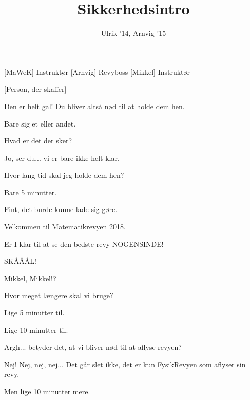 \documentclass[a4paper,11pt]{article}
\title{Sikkerhedsintro}
\author{Ulrik '14, Arnvig '15}
\begin{document}
\maketitle

\begin{roles}
[MaWeK] Instruktør
[Arnvig] Revyboss
[Mikkel] Instruktør
\end{roles}

\begin{props}
[Person, der skaffer]
\end{props}

\begin{sketch}


 Den er helt gal! Du bliver altså nød til at holde dem hen.


 Bare sig et eller andet.

 Hvad er det der sker?

 Jo, ser du... vi er bare ikke helt klar.

 Hvor lang tid skal jeg holde dem hen?

 Bare 5 minutter.

 Fint, det burde kunne lade sig gøre.


 Velkommen til Matematikrevyen 2018.

 Er I klar til at se den bedste revy NOGENSINDE!

 SKÅÅÅL!

 Mikkel, Mikkel!?

 Hvor meget længere skal vi bruge?

 Lige 5 minutter til.


 Lige 10 minutter til.

 Argh... betyder det, at vi bliver nød til at aflyse revyen?

 Nej! Nej, nej, nej... Det går slet ikke, det er kun FysikRevyen som aflyser sin revy.

 Men lige 10 minutter mere.


\end{sketch}
\end{document}
